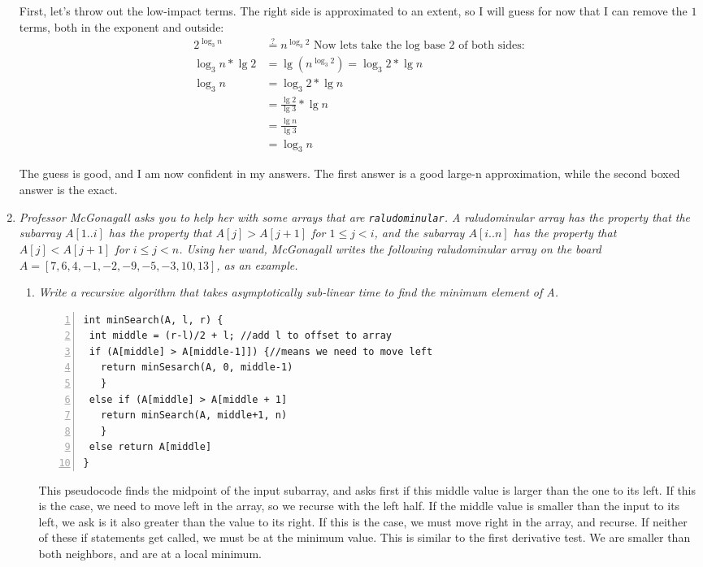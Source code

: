 \documentclass[12pt]{article}
\begin{document}
\begin{enumerate}
		First, let's throw out the low-impact terms. The right side is approximated to an extent, so I will guess for now that I can remove the $1$ terms, both in the exponent and outside:
		\begin{align*}
		2^{\log_3 n} &\stackrel{?}{=} n^{\log_3 2} \text{ Now lets take the log base 2 of both sides:}\\
		\log_3n * \lg 2 &= \lg (n^{\log_3 2}) = \log_3 2 * \lg n\\
		\log_3n &= \log_3 2 * \lg n\\
		&= \frac{\lg 2}{\lg 3}*\lg n\\
		&= \frac{\lg n}{\lg 3}\\
		&= \log_3 n
		\end{align*}
		
		The guess is good, and I am now confident in my answers. The first answer is a good large-n approximation, while the second boxed answer is the exact.
	
	\newpage

      	\item \textit{Professor McGonagall asks you to help her with some arrays that are \texttt{raludominular}. A raludominular array has the property that the subarray $A[1..i]$ has the property that $A[j] > A[j + 1]$ for $1 \le j < i$, and the subarray $A[i..n]$ has the property that $A[j] < A[j + 1]$ for $i \le j < n$. Using her wand, McGonagall writes the following raludominular array on the board $A = [7, 6, 4, -1, -2, -9, -5, -3, 10, 13]$, as an example.}

	\begin{enumerate}
	    \item \textit{Write a recursive algorithm that takes asymptotically sub-linear time to find the minimum element of A.}
	
\begin{Verbatim}[numbers=left,xleftmargin=5mm]
int minSearch(A, l, r) {
 int middle = (r-l)/2 + l; //add l to offset to array
 if (A[middle] > A[middle-1]]) {//means we need to move left
   return minSesarch(A, 0, middle-1)
   }
 else if (A[middle] > A[middle + 1]
   return minSearch(A, middle+1, n)
   }
 else return A[middle]
}
	    \end{Verbatim}
	    
	    This pseudocode finds the midpoint of the input subarray, and asks first if this middle value is larger than the one to its left. If this is the case, we need to move left in the array, so we recurse with the left half. If the middle value is smaller than the input to its left, we ask is it also greater than the value to its right. If this is the case, we must move right in the array, and recurse. If neither of these if statements get called, we must be at the minimum value. This is similar to the first derivative test. We are smaller than both neighbors, and are at a local minimum.
	    

\end{enumerate}
\end{enumerate}
\end{document}
